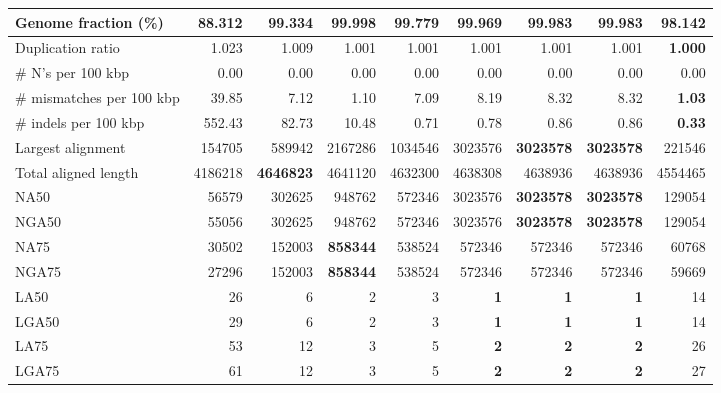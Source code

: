\documentclass[12pt,a4paper]{article}
\begin{document}
\begin{table}[ht]
\begin{center}
\begin{tabular}{|l*{8}{|r}|}
Genome fraction (\%) & 88.312 & 99.334 & {\bf 99.998} & 99.779 & 99.969 & 99.983 & 99.983 & 98.142 \\ \hline
Duplication ratio & 1.023 & 1.009 & 1.001 & 1.001 & 1.001 & 1.001 & 1.001 & {\bf 1.000} \\ \hline
\# N's per 100 kbp & 0.00 & 0.00 & 0.00 & 0.00 & 0.00 & 0.00 & 0.00 & 0.00 \\ \hline
\# mismatches per 100 kbp & 39.85 & 7.12 & 1.10 & 7.09 & 8.19 & 8.32 & 8.32 & {\bf 1.03} \\ \hline
\# indels per 100 kbp & 552.43 & 82.73 & 10.48 & 0.71 & 0.78 & 0.86 & 0.86 & {\bf 0.33} \\ \hline
Largest alignment & 154705 & 589942 & 2167286 & 1034546 & 3023576 & {\bf 3023578} & {\bf 3023578} & 221546 \\ \hline
Total aligned length & 4186218 & {\bf 4646823} & 4641120 & 4632300 & 4638308 & 4638936 & 4638936 & 4554465 \\ \hline
NA50 & 56579 & 302625 & 948762 & 572346 & 3023576 & {\bf 3023578} & {\bf 3023578} & 129054 \\ \hline
NGA50 & 55056 & 302625 & 948762 & 572346 & 3023576 & {\bf 3023578} & {\bf 3023578} & 129054 \\ \hline
NA75 & 30502 & 152003 & {\bf 858344} & 538524 & 572346 & 572346 & 572346 & 60768 \\ \hline
NGA75 & 27296 & 152003 & {\bf 858344} & 538524 & 572346 & 572346 & 572346 & 59669 \\ \hline
LA50 & 26 & 6 & 2 & 3 & {\bf 1} & {\bf 1} & {\bf 1} & 14 \\ \hline
LGA50 & 29 & 6 & 2 & 3 & {\bf 1} & {\bf 1} & {\bf 1} & 14 \\ \hline
LA75 & 53 & 12 & 3 & 5 & {\bf 2} & {\bf 2} & {\bf 2} & 26 \\ \hline
LGA75 & 61 & 12 & 3 & 5 & {\bf 2} & {\bf 2} & {\bf 2} & 27 \\ \hline
\end{tabular}
\end{center}
\end{table}
\end{document}
